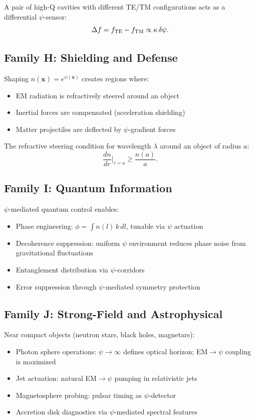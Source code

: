 \documentclass[aps,prd,twocolumn,superscriptaddress,floatfix,nofootinbib]{revtex4-2}
\begin{document}
A pair of high-Q cavities with different TE/TM configurations acts as
a differential $\psi$-sensor:
\begin{equation}
\Delta f = f_{\rm TE} - f_{\rm TM} \propto \kappa\,\delta\psi.
\end{equation}

\subsection{Family H: Shielding and Defense}

Shaping $n(\mathbf{x}) = e^{\psi(\mathbf{x})}$ creates regions where:
\begin{itemize}[nosep]
\item EM radiation is refractively steered around an object
\item Inertial forces are compensated (acceleration shielding)
\item Matter projectiles are deflected by $\psi$-gradient forces
\end{itemize}

The refractive steering condition for wavelength $\lambda$ around an
object of radius $a$:
\begin{equation}
\frac{dn}{dr}\bigg|_{r=a} \geq \frac{n(a)}{a}.
\end{equation}

\subsection{Family I: Quantum Information}

$\psi$-mediated quantum control enables:
\begin{itemize}[nosep]
\item Phase engineering: $\phi = \int n(l)\,k\,dl$, tunable via
$\psi$ actuation
\item Decoherence suppression: uniform $\psi$ environment reduces
phase noise from gravitational fluctuations
\item Entanglement distribution via $\psi$-corridors
\item Error suppression through $\psi$-mediated symmetry protection
\end{itemize}

\subsection{Family J: Strong-Field and Astrophysical}

Near compact objects (neutron stars, black holes, magnetars):
\begin{itemize}[nosep]
\item Photon sphere operations: $\psi \to \infty$ defines optical
horizon; EM$\to\psi$ coupling is maximized
\item Jet actuation: natural EM$\to\psi$ pumping in relativistic jets
\item Magnetosphere probing: pulsar timing as $\psi$-detector
\item Accretion disk diagnostics via $\psi$-mediated spectral features
\end{itemize}
\end{document}
